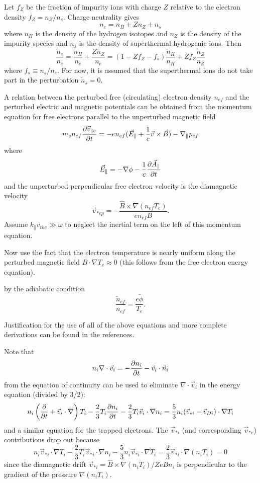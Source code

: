 Let $ f_Z $ be the fraction of impurity ions with charge $Z$
relative to the electron density $ f_Z = n_Z / n_e $.
Charge neutrality gives
\[ n_e = n_H + Z n_Z + n_s \]
where $n_H$ is the density of the hydrogen isotopes and
$n_Z$ is the density of the impurity species and $n_s$ is the density of
superthermal hydrogenic ions.  Then
\[ \frac{\tilde{n}_e}{n_e}
 =  \frac{\tilde{n}_H}{n_e} + \frac{Z \tilde{n}_Z}{n_e}
 =  ( 1 - Z f_Z - f_s ) \frac{\tilde{n}_H}{n_H}
       + Z f_Z \frac{\tilde{n}_Z}{n_Z}  \]
where $ f_s \equiv n_s / n_e $.
For now, it is assumed that the superthermal ions 
do not take part in the perturbation $ \tilde{n}_s = 0.$

A relation between the perturbed free (circulating) electron density 
$ n_{ef} $ and the perturbed electric and magnetic potentials 
can be obtained from the momentum equation for free electrons parallel 
to the unperturbed magnetic field
\[ m_e n_{ef} \frac{\partial \vec{v}_{\parallel e}}{\partial t}
 = -e n_{ef} ( \vec{E}_\parallel + \frac{1}{c} \vec{v} \times \vec{B} )
 - \nabla_\parallel p_{ef} \]
where
\[ \vec{E}_\parallel = - \nabla \phi - \frac{1}{c} \frac{\partial \vec{A}_\parallel}{\partial t} \]
and the unperturbed perpendicular free electron velocity is the 
diamagnetic velocity
\[ \vec{v}_{*ep} = - \frac{\hat{B} \times \nabla ( n_{ef} T_e )}{
   e n_{ef} B}. \]
Assume $ k_\parallel v_{the} \gg \omega $ to neglect the inertial term
on the left of this momentum equation.

Now use the fact that the electron temperature is nearly uniform along
the perturbed magnetic field $ B \cdot \nabla T_e \approx 0 $
(this follows from the free electron energy equation).



by the adiabatic
condition
\[ \frac{\tilde{n}_{ef}}{n_{ef}} = \frac{e \tilde{\phi}}{T_e}. \]

Justification for the use of all of the above equations 
and more complete derivations
can be found in the references.\cite{weil92a,nord90a}

Note that 
\[ n_i \nabla \cdot \vec{v}_i = - \frac{\partial n_i}{\partial t} - \vec{v}_i \cdot \vec{n}_i \]
from the equation of continuity can be used to eliminate
$ \nabla \cdot \vec{v}_i $ in the energy equation (divided by 3/2):
\[ n_i \left( \frac{\partial }{\partial t} + \vec{v}_i \cdot \nabla \right) T_i
-\frac{2}{3} T_i \frac{\partial n_i}{\partial t}
 - \frac{2}{3} T_i \vec{v}_i \cdot \nabla n_i
 = \frac{5}{3} n_i ( \vec{v}_{*i} - \vec{v}_{Di} ) \cdot \nabla T_i \]
and a similar equation for the trapped electrons.
The $\vec{v}_{*i}$ (and corresponding $\vec{v}_{*e}$)
contributions drop out because
\[ n_i \vec{v}_{*i} \cdot \nabla T_i
 - \frac{2}{3} T_i \vec{v}_{*i} \cdot \nabla n_i
 - \frac{5}{3} n_i \vec{v}_{*i} \cdot \nabla T_i
 = \frac{2}{3} \vec{v}_{*i} \cdot \nabla ( n_i T_i ) = 0 \]
since the diamagnetic drift
$ \vec{v}_{*i} = \hat{B} \times \nabla ( n_i T_i ) / ZeB n_i $
is perpendicular to the gradient of the pressure
$ \nabla ( n_i T_i ) $.

